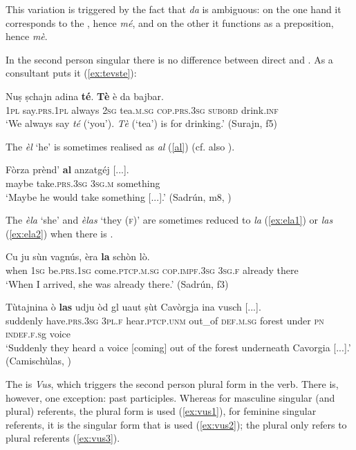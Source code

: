 This variation is triggered by the fact that \textit{da} is ambiguous: on the one hand it corresponds to the , hence \textit{mé}, and on the other it functions as a preposition, hence \textit{mè}.

In the second person singular there is no difference between direct and . As a consultant puts it (\ref{ex:tevste}):

\ea
\label{ex:tevste}
\gll  Nuṣ ṣchajn adina \textbf{té}. \textbf{Tè} è da bajbar.\\
\textsc{1pl} say.\textsc{prs.1pl} always \textsc{2sg} tea.\textsc{m.sg} \textsc{cop.prs.3sg} \textsc{subord} drink.\textsc{inf}\\
\glt `We always say \textit{té} (`you'). \textit{Tè} (`tea') is for drinking.' ({Surajn, f5})
\z

The  \textit{èl} `he' is sometimes realised as \textit{al} (\ref{al}) (cf. also ).

\ea
\label{al}
\gll Fòrza prènd’ \textbf{al} anzatgéj [...].\\
maybe take.\textsc{prs.3sg} \textsc{3sg.m} something\\
\glt `Maybe he would take something [...].' (Sadrún, m8, )
\z

The  \textit{èla} `she' and \textit{èlas} `they  (\textsc{f})' are sometimes reduced to \textit{la} (\ref{ex:ela1}) or \textit{las} (\ref{ex:ela2}) when there is .

\ea
\label{ex:ela1}
\gll Cu ju sùn vagnús, èra \textbf{la} schòn lò.\\
when \textsc{1sg} be.\textsc{prs.1sg} come.\textsc{ptcp.m.sg}  \textsc{cop.impf.3sg} \textsc{3sg.f} already there\\
\glt `When I arrived, she was already there.' (Sadrún, f3)
\z

\ea
\label{ex:ela2}
\gll Tùtajnina ò \textbf{las} udju òd gl uaut ṣùt Cavòrgja ina vusch [...].\\
suddenly have.\textsc{prs.3sg} \textsc{3pl.f} hear.\textsc{ptcp.unm} out\_of \textsc{def.m.sg} forest under \textsc{pn} \textsc{indef.f.s}g voice\\
\glt `Suddenly they heard a voice [coming] out of the forest underneath Cavorgia [...].' (Camischùlas, \citealt[82]{Büchli1966})
\z

The  is \textit{Vus}, which triggers the second person plural form in the verb. There is, however, one exception: past participles. Whereas for masculine singular (and plural) referents, the plural form is used (\ref{ex:vus1}), for feminine singular referents, it is the singular form that is used (\ref{ex:vus2}); the plural only refers to plural referents (\ref{ex:vus3}).

